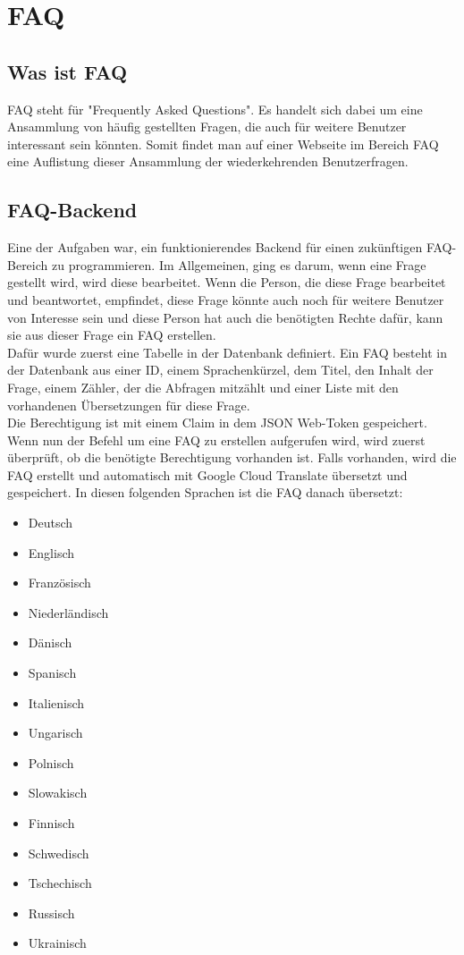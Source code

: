 \chapter{FAQ}
\section{Was ist FAQ}
FAQ steht für "Frequently Asked Questions". Es handelt sich dabei um eine Ansammlung von häufig gestellten Fragen, die auch für weitere Benutzer interessant sein könnten. Somit findet man auf einer Webseite im Bereich FAQ eine Auflistung dieser Ansammlung der wiederkehrenden Benutzerfragen.
\section{FAQ-Backend}
Eine der Aufgaben war, ein funktionierendes Backend für einen zukünftigen FAQ-Bereich zu programmieren. Im Allgemeinen, ging es darum, wenn eine Frage gestellt wird, wird diese bearbeitet. Wenn die Person, die diese Frage bearbeitet und beantwortet, empfindet, diese Frage könnte auch noch für weitere Benutzer von Interesse sein und diese Person hat auch die benötigten Rechte dafür, kann sie aus dieser Frage ein FAQ erstellen.\\
Dafür wurde zuerst eine Tabelle in der Datenbank definiert. Ein FAQ besteht in der Datenbank aus einer ID, einem Sprachenkürzel, dem Titel, den Inhalt der Frage, einem Zähler, der die Abfragen mitzählt und einer Liste mit den vorhandenen Übersetzungen für diese Frage.\\
Die Berechtigung ist mit einem Claim in dem JSON Web-Token gespeichert. Wenn nun der Befehl um eine FAQ zu erstellen aufgerufen wird, wird zuerst überprüft, ob die benötigte Berechtigung vorhanden ist. Falls vorhanden, wird die FAQ erstellt und automatisch mit Google Cloud Translate übersetzt und gespeichert. In diesen folgenden Sprachen ist die FAQ danach übersetzt:
\begin{multicols}{2}
\begin{itemize}
	\item Deutsch
	\item Englisch
	\item Französisch
	\item Niederländisch
	\item Dänisch
	\item Spanisch
	\item Italienisch
	\item Ungarisch
	\item Polnisch
	\item Slowakisch
	\item Finnisch
	\item Schwedisch
	\item Tschechisch
	\item Russisch
	\item Ukrainisch
\end{itemize}
\end{multicols}
